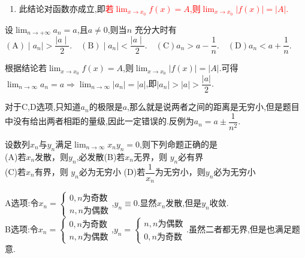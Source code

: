 \documentclass[8pt a4paper, oneside, UTF8]{ctexbook}
\begin{document}
\begin{sloppypar}
\begin{note}
\begin{enumerate}
            \item 此结论对函数亦成立,即\textcolor{red}{若$\lim_{x\to x_0 }f\left(x\right)=A$,则$\lim_{x\to x_0}\left|f\left(x\right)\right|=\left|A\right|.$}
        \end{enumerate}
    \end{note}
    \begin{problem}
        设$\lim_{n \to +\infty} a_n=a$,且$a\neq0$,则当$n$ 充分大时有\\
        $\mathrm{(A)}\mid a_n\mid>\dfrac{\mid a\mid}{2}.\quad\mathrm{(B)}\mid a_n\mid<\dfrac{\mid a\mid}{2}.\quad\mathrm{(C)}a_n>a-\dfrac{1}{n}.\quad\mathrm{(D)}a_n<a+\dfrac{1}{n}.$
    \end{problem}
    \begin{solution}
        根据结论若$\lim_{x\to x_0 }f\left(x\right)=A$,则$\lim_{x\to x_0}\left|f\left(x\right)\right|=\left|A\right|.$可得$\lim_{n \to \infty}a_n=a \Rightarrow \lim_{n \to \infty}|a_n|=|a|$,即$|a_n|>|a| > \dfrac{|a|}{2}$.
    \end{solution}
    \begin{note}
        对于C,D选项,只知道$a_n$的极限是$a$,那么就是说两者之间的距离是无穷小,但是题目中没有给出两者相距的量级,因此一定错误的.反例为$a_n= a \pm \dfrac{1}{n^2}$.\label{pro3}
    \end{note} 
    \begin{problem}
        设数列${x_n} $与${y_n}$满足$\lim_{n \to \infty} x_ny_n=0$,则下列命题正确的是\\
        (A)若$x_n$发散，则$y_n$,必发散\quad (B)若$x_n$无界，则 $y_n$必有界\\
        (C)若$x_n$有界，则 $y_n$必为无穷小 \quad(D)若$\dfrac{1}{x_n}$为无穷小，则$y_{n}$必为无穷小
    \end{problem}
    \begin{solution}
        A选项:令$x_n=\begin{cases}
            0, n\text{为奇数}\\
            n, n\text{为偶数}
        \end{cases}$,$y_n \equiv 0$.显然$x_n$发散,但是$y_n$收敛.\\
        B选项:令$x_n=\begin{cases}
            0, n\text{为奇数}\\
            n, n\text{为偶数}
        \end{cases}$,$y_n=\begin{cases}
            n, n\text{为偶数}\\
            0, n\text{为奇数}
        \end{cases}$.虽然二者都无界,但是也满足题意.\\

\end{solution}
\end{sloppypar}
\end{document}
